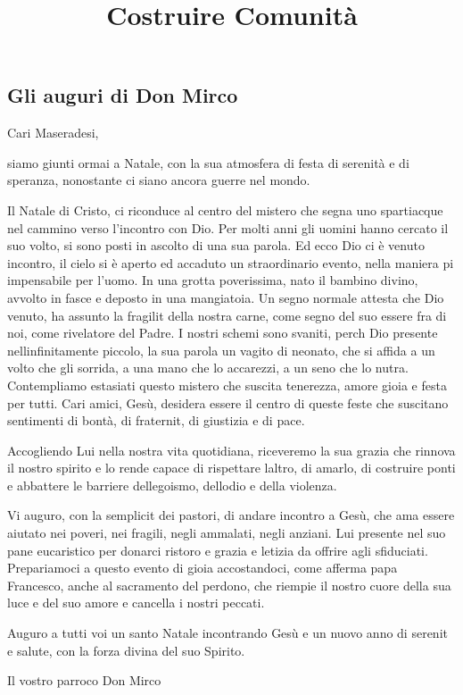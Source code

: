 \documentclass[a5paper,10pt]{article} %
\title{Costruire Comunità} %
\author{}
\begin{document}
  \maketitle
  
  \clearpage 
\begin{justify}
\section{Gli auguri di Don Mirco}
Cari Maseradesi,

siamo giunti ormai a Natale, con la sua atmosfera di festa di serenità e di speranza, nonostante ci siano ancora guerre nel mondo.

Il Natale di Cristo, ci riconduce al centro del mistero che segna uno spartiacque nel cammino verso l'incontro con Dio. Per molti anni gli uomini hanno cercato il suo volto, si sono posti in ascolto di una sua parola. Ed ecco Dio ci è venuto incontro, il cielo si è aperto ed  accaduto un straordinario evento, nella maniera pi impensabile per l'uomo. In una grotta poverissima,  nato il bambino divino, avvolto in fasce e deposto in una mangiatoia. Un segno normale attesta che Dio  venuto, ha assunto la fragilit della nostra carne, come segno del suo essere fra di noi, come rivelatore del Padre. I nostri schemi sono svaniti, perch Dio  presente nellinfinitamente piccolo, la sua parola un vagito di neonato, che si affida a un volto che gli sorrida, a una mano che lo accarezzi, a un seno che lo nutra. Contempliamo estasiati questo mistero che suscita tenerezza, amore gioia e festa per tutti. Cari amici, Gesù, desidera essere il centro di queste feste che suscitano sentimenti di bontà, di fraternit, di giustizia e di pace.

Accogliendo Lui nella nostra vita quotidiana, riceveremo la sua grazia che rinnova il nostro spirito e lo rende capace di rispettare laltro, di amarlo, di costruire ponti e abbattere le barriere dellegoismo, dellodio e della violenza.

Vi auguro, con la semplicit dei pastori, di andare incontro a Gesù, che ama essere aiutato nei poveri, nei fragili, negli ammalati, negli anziani. Lui  presente nel suo pane eucaristico per donarci ristoro e grazia e letizia da offrire agli sfiduciati. Prepariamoci a questo evento di gioia accostandoci, come afferma papa Francesco, anche al sacramento del perdono, che riempie il nostro cuore della sua luce e del suo amore e cancella i nostri peccati.

Auguro a tutti voi un santo Natale incontrando Gesù e un nuovo anno di serenit e salute, con la forza divina del suo Spirito.
\end{justify}
\begin{flushright}
    Il vostro parroco Don Mirco
\end{flushright}
\end{document}
